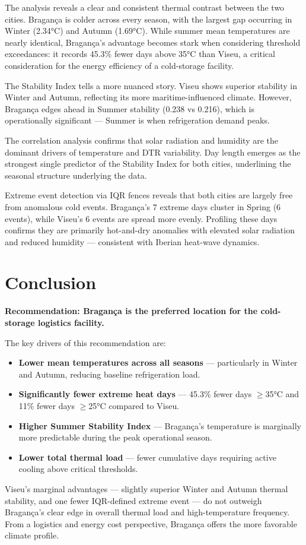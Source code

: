 \documentclass[11pt,a4paper]{article}
\begin{document}
The analysis reveals a clear and consistent thermal contrast between the two cities. Bragança is colder across every season, with the largest gap occurring in Winter (2.34°C) and Autumn (1.69°C). While summer mean temperatures are nearly identical, Bragança's advantage becomes stark when considering threshold exceedances: it records 45.3\% fewer days above 35°C than Viseu, a critical consideration for the energy efficiency of a cold-storage facility.

The Stability Index tells a more nuanced story. Viseu shows superior stability in Winter and Autumn, reflecting its more maritime-influenced climate. However, Bragança edges ahead in Summer stability (0.238 vs 0.216), which is operationally significant — Summer is when refrigeration demand peaks.

The correlation analysis confirms that solar radiation and humidity are the dominant drivers of temperature and DTR variability. Day length emerges as the strongest single predictor of the Stability Index for both cities, underlining the seasonal structure underlying the data.

Extreme event detection via IQR fences reveals that both cities are largely free from anomalous cold events. Bragança's 7 extreme days cluster in Spring (6 events), while Viseu's 6 events are spread more evenly. Profiling these days confirms they are primarily hot-and-dry anomalies with elevated solar radiation and reduced humidity — consistent with Iberian heat-wave dynamics.

\section{Conclusion}

\textbf{Recommendation: Bragança is the preferred location for the cold-storage logistics facility.}

The key drivers of this recommendation are:

\begin{itemize}
  \item \textbf{Lower mean temperatures across all seasons} — particularly in Winter and Autumn, reducing baseline refrigeration load.
  \item \textbf{Significantly fewer extreme heat days} — 45.3\% fewer days $\geq$35°C and 11\% fewer days $\geq$25°C compared to Viseu.
  \item \textbf{Higher Summer Stability Index} — Bragança's temperature is marginally more predictable during the peak operational season.
  \item \textbf{Lower total thermal load} — fewer cumulative days requiring active cooling above critical thresholds.
\end{itemize}

Viseu's marginal advantages — slightly superior Winter and Autumn thermal stability, and one fewer IQR-defined extreme event — do not outweigh Bragança's clear edge in overall thermal load and high-temperature frequency. From a logistics and energy cost perspective, Bragança offers the more favorable climate profile.
\end{document}

